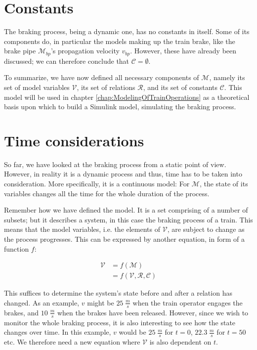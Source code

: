 \section{Constants}
\label{sec:Constants}
\par\noindent
The braking process, being a dynamic one, has no constants in itself. Some of its components do, in particular the models making up the train brake, like the brake pipe ${\mathcal{M}}_{bp}$'s propagation velocity $v_{bp}$. However, these have already been discussed; we can therefore conclude that ${\mathcal{C}} = \emptyset$.
\bigskip
\par\noindent
To summarize, we have now defined all necessary components of ${\mathcal{M}}$, namely its set of model variables ${\mathcal{V}}$, its set of relations ${\mathcal{R}}$, and its set of constants ${\mathcal{C}}$. This model will be used in chapter \ref{chap:ModelingOfTrainOperations} as a theoretical basis upon which to build a Simulink model, simulating the braking process.

\section{Time considerations}
\label{sec:TimeConsiderations}
\par\noindent
So far, we have looked at the braking process from a static point of view. However, in reality it is a dynamic process and thus, time has to be taken into consideration. More specifically, it is a continuous model: For ${\mathcal{M}}$, the state of its variables changes all the time for the whole duration of the process. 
\par
Remember how we have defined the model. It is a set comprising of a number of subsets; but it describes a system, in this case the braking process of a train. This means that the model variables, i.e. the elements of ${\mathcal{V}}$, are subject to change as the process progresses. This can be expressed by another equation, in form of a function $f$:

\begin{align*}
{\mathcal{V}} &= f( {\mathcal{M}} ) \\
		&= f( {\mathcal{V}}, {\mathcal{R}}, {\mathcal{C}} )
\end{align*}

\noindent
This suffices to determine the system's state before and after a relation has changed. As an example, $v$ might be $25 \; \frac{m}{s}$ when the train operator engages the brakes, and $10 \; \frac{m}{s}$ when the brakes have been released. However, since we wish to monitor the whole braking process, it is also interesting to see how the state changes over time. In this example, $v$ would be $25 \; \frac{m}{s}$ for $t=0$, $22.3 \; \frac{m}{s}$ for $t=50$ etc. We therefore need a new equation where ${\mathcal{V}}$ is also dependent on $t$.

